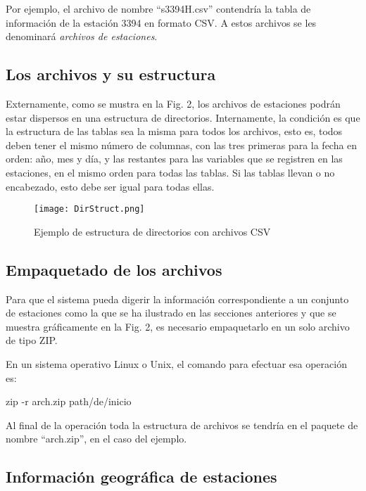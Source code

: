 \documentclass[spanish,]{article}
\newenvironment{Shaded}{\begin{snugshade}}{\end{snugshade}}
\newcommand{\FunctionTok}[1]{\textcolor[rgb]{0.00,0.00,0.00}{#1}}
\newcommand{\NormalTok}[1]{#1}
\begin{document}
Por ejemplo, el archivo de nombre ``s3394H.csv'' contendría la tabla de
información de la estación 3394 en formato CSV. A estos archivos se les
denominará \emph{archivos de estaciones}.

\subsection{Los archivos y su
estructura}\label{los-archivos-y-su-estructura}

Externamente, como se mustra en la Fig. 2, los archivos de estaciones
podrán estar dispersos en una estructura de directorios. Internamente,
la condición es que la estructura de las tablas sea la misma para todos
los archivos, esto es, todos deben tener el mismo número de columnas,
con las tres primeras para la fecha en orden: año, mes y día, y las
restantes para las variables que se registren en las estaciones, en el
mismo orden para todas las tablas. Si las tablas llevan o no encabezado,
esto debe ser igual para todas ellas.

\begin{figure}
\centering
\texttt{[image: DirStruct.png]}
\caption{Ejemplo de estructura de directorios con archivos CSV}
\end{figure}

\subsection{Empaquetado de los
archivos}\label{empaquetado-de-los-archivos}

Para que el sistema pueda digerir la información correspondiente a un
conjunto de estaciones como la que se ha ilustrado en las secciones
anteriores y que se muestra gráficamente en la Fig. 2, es necesario
empaquetarlo en un solo archivo de tipo ZIP.

En un sistema operativo Linux o Unix, el comando para efectuar esa
operación es:

\begin{Shaded}
\begin{Highlighting}[]
\FunctionTok{zip}\NormalTok{ -r arch.zip path/de/inicio}
\end{Highlighting}
\end{Shaded}

Al final de la operación toda la estructura de archivos se tendría en el
paquete de nombre ``arch.zip'', en el caso del ejemplo.

\subsection{Información geográfica de
estaciones}\label{informacion-geografica-de-estaciones}
\end{document}
